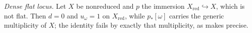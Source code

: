 \item \emph{Dense flat locus.}  Let $X$ be nonreduced and $p$ the immersion
  $X_{\mathrm{red}}\hookrightarrow X$, which is not flat.  Then $d=0$ and
  $u_\omega=1$ on $X_{\mathrm{red}}$, while $p_*[\omega]$ carries the generic
  multiplicity of $X$; the identity fails by exactly that multiplicity, as
   makes precise.
